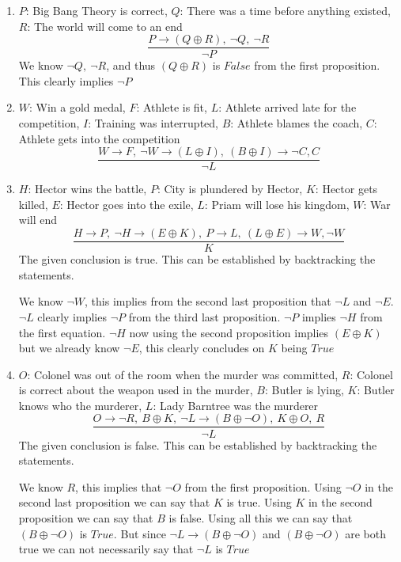 \documentclass[10.5pt]{article}
\newenvironment{solution}[2][Solution]{ \begin{trivlist}
\item[\hskip \labelsep {\bfseries #1}]}{\end{trivlist}}
\begin{document}
\begin{solution}{1}
\item[]
\begin{enumerate}
  \parskip=0in
  \parsep=0in
  \itemsep=0in
\item $P$: Big Bang Theory is correct, $Q$: There was a time before anything existed, $R$: The world will come to an end
\[
\frac{P\rightarrow(Q \oplus R),\ \neg Q,\ \neg R}{\neg P}
\]
We know $\neg Q,\ \neg R$, and thus $(Q \oplus R)$ is $False$ from the first proposition. This clearly implies $\neg P$

\item $W$: Win a gold medal, $F$: Athlete is fit, $L$: Athlete arrived late for the competition, $I$: Training was interrupted, $B$: Athlete blames the coach, $C$: Athlete gets into the competition
\[
\frac{W \rightarrow F,\ \neg W \rightarrow (L \oplus I),\ (B \oplus I) \rightarrow \neg C, C}{\neg L}
\]
\item $H$: Hector wins the battle, $P$: City is plundered by Hector, $K$: Hector gets killed, $E$: Hector goes into the exile, $L$: Priam will lose his kingdom, $W$: War will end  \\
\[
\frac{H \rightarrow P,\ \neg H \rightarrow (E \oplus K),\ P \rightarrow L,\ (L \oplus E) \rightarrow W, \neg W}{K}
\]
The given conclusion is true. This can be established by backtracking the statements.

We know $\neg W$, this implies from the second last proposition that $\neg L$ and $\neg E$. $\neg L$ clearly implies $\neg P$ from the third last proposition. $\neg P$ implies $\neg H$ from the first equation. $\neg H$ now using the second proposition implies $(E \oplus K)$ but we already know $\neg E$, this clearly concludes on $K$ being $True$
\\
\item $O$: Colonel was out of the room when the murder was committed, $R$: Colonel is correct about the weapon used in the murder, $B$: Butler is lying, $K$: Butler knows who the murderer, $L$: Lady Barntree was the murderer
\[
\frac{O \rightarrow \neg R,\ B \oplus K,\ \neg L \rightarrow (B \oplus \neg O),\ K \oplus O,\ R}{\neg L}
\]
The given conclusion is false. This can be established by backtracking the statements.

We know $R$, this implies that $\neg O$ from the first proposition. Using $\neg O$ in the second last proposition we can say that $K$ is true. Using $K$ in the second proposition we can say that $B$ is false. Using all this we can say that $(B \oplus \neg O)$ is $True$. But since $\neg L \rightarrow (B \oplus \neg O)$ and $(B \oplus \neg O)$ are both true we can not necessarily say that $\neg L$ is $True$
\end{enumerate}
\end{solution}
\end{document}
